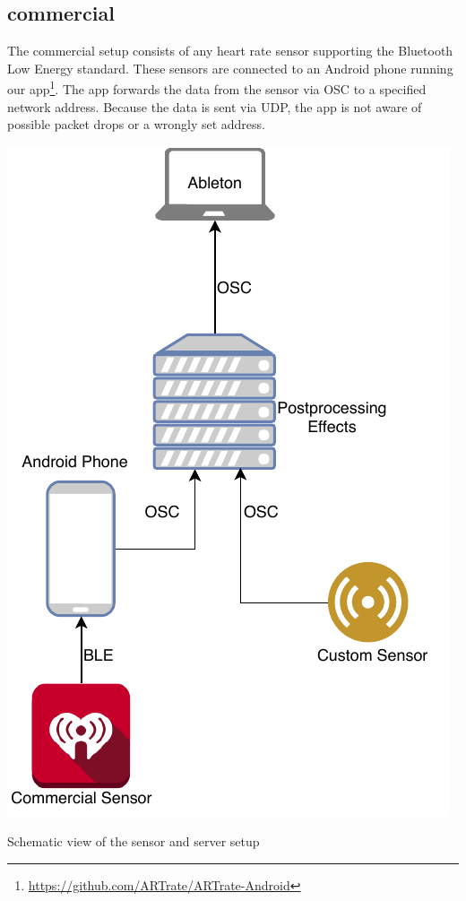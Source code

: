 \documentclass{sigchi-ext}
\begin{document}
\subsection{commercial}

The commercial setup consists of any heart rate sensor supporting the Bluetooth Low Energy
standard. These sensors are connected to an Android phone running our app\footnote{\url{https://github.com/ARTrate/ARTrate-Android}}.
The app forwards the data from the sensor via OSC to a specified network address.
Because the data is sent via UDP, the app is not aware of possible packet drops or a wrongly set address.

\begin{marginfigure}[-44pc]
  \begin{minipage}{\marginparwidth}
    \centering
    \includegraphics[width=0.9\marginparwidth]{figures/topology}
    \caption{Schematic view of the sensor and server setup}
    \label{fig:setup}
  \end{minipage}
\end{marginfigure}
\end{document}
